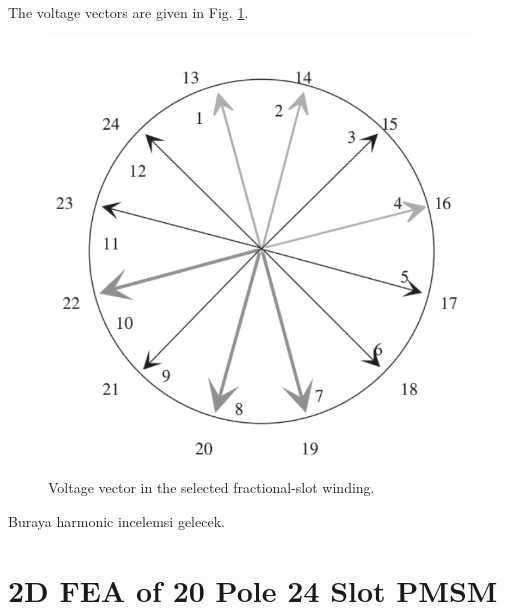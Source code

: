 \documentclass{article}
\begin{document}
The voltage vectors are given in Fig. \ref{fig:voltagefrac}.
\begin{figure}[H]
	\centering
	\includegraphics[width=0.7\linewidth]{Figurler/20p24s}
	\caption{Voltage vector in the selected fractional-slot winding.}
	\label{fig:voltagefrac}
\end{figure}
 Buraya harmonic incelemsi gelecek.
 
 
 \section{2D FEA of 20 Pole 24 Slot PMSM}
 
 
 
\end{document}
